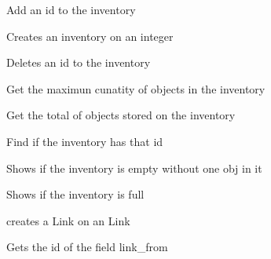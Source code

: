 
\begin{DoxyRefList}
\item[\label{test__test000003}%
\Hypertarget{test__test000003}%
Global \hyperlink{inventory__tb_8c_a40a21fc4411716ecfa2bbb33c783df94}{test1\+\_\+inventory\+\_\+add\+\_\+id} ()]Add an id to the inventory  
\item[\label{test__test000001}%
\Hypertarget{test__test000001}%
Global \hyperlink{inventory__tb_8c_a33638f1a88ae16ab8d6bee00145b82b8}{test1\+\_\+inventory\+\_\+create} ()]Creates an inventory on an integer  
\item[\label{test__test000005}%
\Hypertarget{test__test000005}%
Global \hyperlink{inventory__tb_8c_a155511682587d9cd63fbd2b62c74dffe}{test1\+\_\+inventory\+\_\+del\+\_\+id} ()]Deletes an id to the inventory  
\item[\label{test__test000009}%
\Hypertarget{test__test000009}%
Global \hyperlink{inventory__tb_8c_a17c03f02b989bb00b04155c12fe2af9d}{test1\+\_\+inventory\+\_\+get\+\_\+max} ()]Get the maximun cunatity of objects in the inventory  
\item[\label{test__test000011}%
\Hypertarget{test__test000011}%
Global \hyperlink{inventory__tb_8c_a785aa6d245c8e804d5de1e32987ddf8d}{test1\+\_\+inventory\+\_\+get\+\_\+total} ()]Get the total of objects stored on the inventory  
\item[\label{test__test000007}%
\Hypertarget{test__test000007}%
Global \hyperlink{inventory__tb_8c_a596b3986287f989bbbcaaad879c0c516}{test1\+\_\+inventory\+\_\+has\+\_\+id} ()]Find if the inventory has that id  
\item[\label{test__test000015}%
\Hypertarget{test__test000015}%
Global \hyperlink{inventory__tb_8c_afe8c9730e30b58535afc0481970ab2b1}{test1\+\_\+inventory\+\_\+is\+\_\+empty} ()]Shows if the inventory is empty without one obj in it  
\item[\label{test__test000013}%
\Hypertarget{test__test000013}%
Global \hyperlink{inventory__tb_8c_a7eb3ba387e33c42ff45331c9d9aada34}{test1\+\_\+inventory\+\_\+is\+\_\+full} ()]Shows if the inventory is full  
\item[\label{test__test000017}%
\Hypertarget{test__test000017}%
Global \hyperlink{link__tb_8c_aeb3f2663184f88a9323d8d785e1f3683}{test1\+\_\+\+Link\+\_\+create} ()]creates a Link on an Link  
\item[\label{test__test000035}%
\Hypertarget{test__test000035}%
Global \hyperlink{link__tb_8c_ad9d071835574a5da1e2fc6975fb5bd50}{test1\+\_\+\+Link\+\_\+get\+\_\+from} ()]Gets the id of the field link\+\_\+from  

\end{DoxyRefList}
